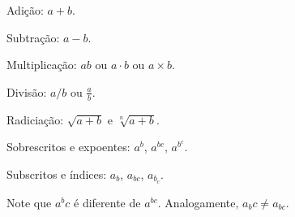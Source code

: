 \documentclass[a4paper,12pt]{article}
\begin{document}
	Adição: \( a + b \).
	
	Subtração: \( a - b \).
	
	Multiplicação: \( a b \) ou \( a\cdot b \) ou \( a \times b \).
	
	Divisão: \(a/b\) ou \(\frac{a}{b}\).
	
	Radiciação: \( \sqrt{a + b} \) e \(\sqrt[n]{a + b}\).

	Sobrescritos e expoentes: \( a^{b} \), \(a^{bc}\), \(a^{b^{c}}\).
		
	Subscritos e índices: \( a_{b} \), \(a_{bc}\), \(a_{b_{c}}\).
	
	\bigskip %

	Note que \(a^bc\) é diferente de \(a^{bc}\). Analogamente, \(a_bc \ne a_{bc}\).
\end{document}
